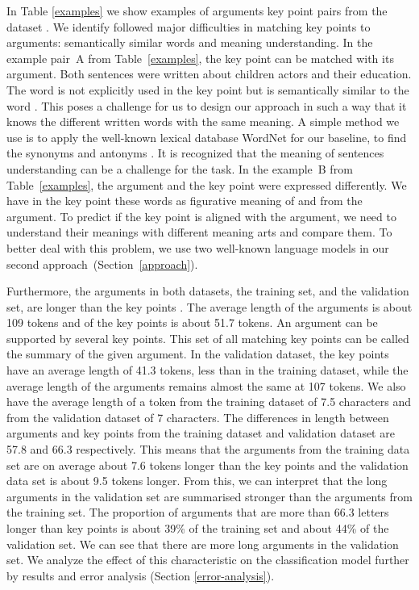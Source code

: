 In Table \ref{examples} we show examples of arguments key point pairs from the \ArgKP dataset \cite{Bar-HaimEFKLS2020}. 
We identify followed major difficulties in matching key points to arguments: semantically similar words and meaning understanding.
In the example pair~A from Table~\ref{examples}, the key point can be matched with its argument. Both sentences were written about children actors and their education. The word  is not explicitly used in the key point but is semantically similar to the word . 
This poses a challenge for us to design our approach in such a way that it knows the different written words with the same meaning. 
A simple method we use is to apply the well-known lexical database WordNet for our baseline, to find the synonyms and antonyms \cite{Miller1995}.
It is recognized that the meaning of sentences understanding can be a challenge for the task. 
In the example~B from Table~\ref{examples}, the argument and the key point were expressed differently. 
We have in the key point these words  as figurative meaning of  and  from the argument. 
To predict if the key point is aligned with the argument, we need to understand their meanings with different meaning arts and compare them. 
To better deal with this problem, we use two well-known language models in our second approach~(Section~\ref{approach}). 

Furthermore, the arguments in both datasets, the training set, and the validation set, are longer than the key points . 
The average length of the arguments is about 109 tokens and of the key points is about 51.7 tokens. 
An argument can be supported by several key points. This set of all matching key points can be called the summary of the given argument.  
In the validation dataset, the key points have an average length of 41.3 tokens, less than in the training dataset, while the average length of the arguments remains almost the same at 107 tokens. 
We also have the average length of a token from the training dataset of 7.5 characters and from the validation dataset of 7 characters. 
The differences in length between arguments and key points from the training dataset and validation dataset are 57.8 and 66.3 respectively. 
This means that the arguments from the training data set are on average about 7.6 tokens longer than the key points and the validation data set is about 9.5 tokens longer. 
From this, we can interpret that the long arguments in the validation set are summarised stronger than the arguments from the training set. 
The proportion of arguments that are more than 66.3 letters longer than key points is about 39\% of the training set and about 44\% of the validation set. We can see that there are more long arguments in the validation set. 
We analyze the effect of this characteristic on the classification model further by results and error analysis (Section \ref{error-analysis}).
